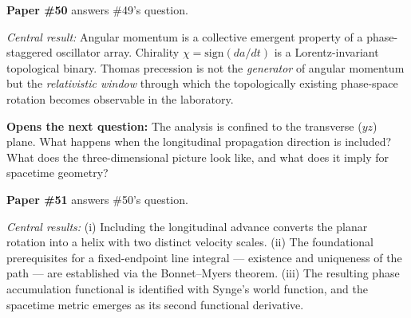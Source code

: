 \documentclass[12pt,letterpaper]{article}
\begin{document}
\begin{mdframed}[style=greenbox]
\textbf{\textcolor{threadgreen}{Paper \#50}} answers \#49's question.\par\vspace{4pt}
\emph{Central result:} Angular momentum is a collective emergent property of a
phase-staggered oscillator array. Chirality $\chi = \mathrm{sign}(da/dt)$ is
a Lorentz-invariant topological binary.
Thomas precession is not the \emph{generator} of angular momentum but the
\emph{relativistic window} through which the topologically existing phase-space
rotation becomes observable in the laboratory.\par\vspace{4pt}
\textbf{Opens the next question:} The analysis is confined to the transverse ($yz$) plane.
What happens when the longitudinal propagation direction is included?
What does the three-dimensional picture look like, and what does it imply for spacetime geometry?
\end{mdframed}

\vspace{0.3cm}

\begin{mdframed}[style=purplebox]
\textbf{\textcolor{threadpurple}{Paper \#51}} answers \#50's question.\par\vspace{4pt}
\emph{Central results:} (i) Including the longitudinal advance converts the planar rotation
into a helix with two distinct velocity scales.
(ii) The foundational prerequisites for a fixed-endpoint line integral --- existence and
uniqueness of the path --- are established via the Bonnet--Myers theorem.
(iii) The resulting phase accumulation functional is identified with Synge's world function,
and the spacetime metric emerges as its second functional derivative.
\end{mdframed}

\vspace{0.3cm}
\end{document}
